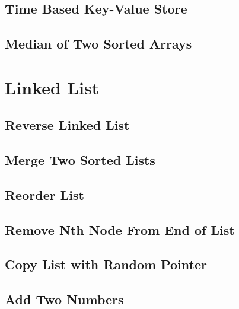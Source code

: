 \documentclass[12pt,letterpaper]{book}
\theoremstyle{definition}
\theoremstyle{remark}
\begin{document}

\section{Time Based Key-Value Store}


\section{Median of Two Sorted Arrays}


\chapter{Linked List}

\section{Reverse Linked List}


\section{Merge Two Sorted Lists}


\section{Reorder List}


\section{Remove Nth Node From End of List}


\section{Copy List with Random Pointer}


\section{Add Two Numbers}
\end{document}

